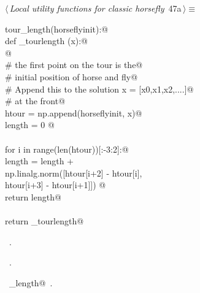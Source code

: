 \documentclass[11.5pt]{report}
\begin{document}
\begin{flushleft} \small\label{scrap71}\raggedright\small
{} $\langle\,${\itshape Local utility functions for classic horsefly}\nobreak\ {\footnotesize {47a}}$\,\rangle\equiv$
\vspace{-1ex}
\begin{list}{}{} \item
\mbox{}\verb@def tour_length(horseflyinit):@\\
\mbox{}\verb@   def _tourlength (x):@\\
\mbox{}\verb@         @\\
\mbox{}\verb@        # the first point on the tour is the@\\
\mbox{}\verb@        # initial position of horse and fly@\\
\mbox{}\verb@        # Append this to the solution x = [x0,x1,x2,....]@\\
\mbox{}\verb@        # at the front@\\
\mbox{}\verb@        htour = np.append(horseflyinit, x)@\\
\mbox{}\verb@        length = 0 @\\
\mbox{}\verb@@\\
\mbox{}\verb@        for i in range(len(htour))[:-3:2]:@\\
\mbox{}\verb@                length = length + \@\\
\mbox{}\verb@                         np.linalg.norm([htour[i+2] - htour[i], \@\\
\mbox{}\verb@                                         htour[i+3] - htour[i+1]]) @\\
\mbox{}\verb@        return length@\\
\mbox{}\verb@@\\
\mbox{}\verb@   return _tourlength@\\
\mbox{}\verb@@{\NWsep}
\end{list}
\vspace{-1.5ex}
\footnotesize
\begin{list}{}{\setlength{\itemsep}{-\parsep}\setlength{\itemindent}{-\leftmargin}}
\item \NWtxtMacroDefBy\ .
\item \NWtxtMacroRefIn\ .
\item \NWtxtIdentsDefed\nobreak\  \verb@tour_length@\nobreak\ .
\item{}
\end{list}
\vspace{4ex}
\end{flushleft}
\end{document}
